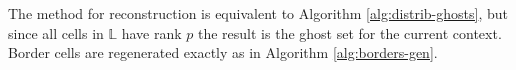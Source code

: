 \documentclass{IIBproject}
\begin{document}
The method for reconstruction is equivalent to Algorithm \ref{alg:distrib-ghosts}, but since all cells in $\mathbb{L}$ have rank $p$ the result is the ghost set for the current context. Border cells are regenerated exactly as in Algorithm \ref{alg:borders-gen}.











\end{document}
